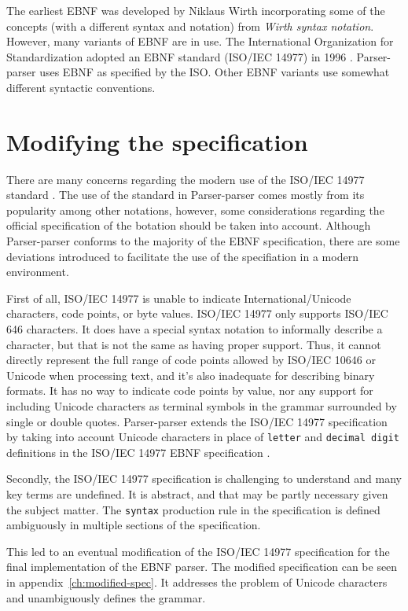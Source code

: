\documentclass[english,engineering]{wizthesis}
\newcommand{\thisproject}{Parser-parser}
\begin{document}
The earliest EBNF was developed by Niklaus Wirth incorporating some of the
concepts (with a different syntax and notation) from \emph{Wirth syntax
notation}. However, many variants of EBNF are in use. The International
Organization for Standardization adopted an EBNF standard (ISO/IEC 14977) in
1996 \cite{iso-14977}. \thisproject{} uses EBNF as specified by the ISO. Other
EBNF variants use somewhat different syntactic conventions.

\section{Modifying the specification} \label{sec:modified-specification}

There are many concerns regarding the modern use of the ISO/IEC 14977 standard
\cite{wheeler-2019}. The use of the standard in \thisproject{} comes mostly from
its popularity among other notations, however, some considerations regarding the
official specification of the botation should be taken into account. Although
\thisproject{} conforms to the majority of the EBNF specification, there are
some deviations introduced to facilitate the use of the specifiation in a modern
environment.

First of all, ISO/IEC 14977 is unable to indicate International/Unicode
characters, code points, or byte values. ISO/IEC 14977 only supports ISO/IEC 646
characters. It does have a special syntax notation to informally describe a
character, but that is not the same as having proper support. Thus, it cannot
directly represent the full range of code points allowed by ISO/IEC 10646 or
Unicode when processing text, and it’s also inadequate for describing binary
formats. It has no way to indicate code points by value, nor any support for
including Unicode characters as terminal symbols in the grammar surrounded by
single or double quotes. \thisproject{} extends the ISO/IEC 14977 specification
by taking into account Unicode characters in place of \texttt{letter} and
\texttt{decimal digit} definitions in the ISO/IEC 14977 EBNF specification
\cite{iso-14977}.

Secondly, the ISO/IEC 14977 specification is challenging to understand and many
key terms are undefined. It is abstract, and that may be partly necessary given
the subject matter. The \texttt{syntax} production rule in the specification is
defined ambiguously in multiple sections of the specification.

This led to an eventual modification of the ISO/IEC 14977 specification for the
final implementation of the EBNF parser. The modified specification can be seen
in appendix~\ref{ch:modified-spec}. It addresses the problem of Unicode
characters and unambiguously defines the grammar.
\end{document}
